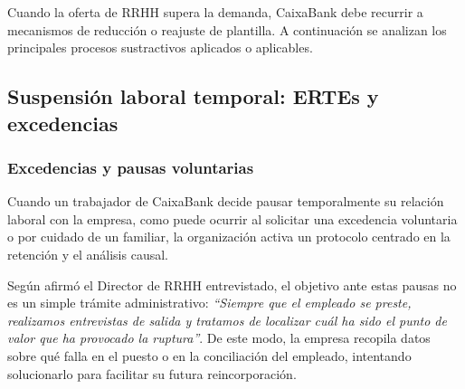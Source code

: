 %
%
%
%

Cuando la oferta de RRHH supera la demanda, CaixaBank debe recurrir a
mecanismos de reducción o reajuste de plantilla. A continuación se
analizan los principales procesos sustractivos aplicados o aplicables.
\subsection{Suspensión laboral temporal: ERTEs y excedencias}

\subsubsection{Excedencias y pausas voluntarias}

Cuando un trabajador de CaixaBank decide pausar temporalmente su relación laboral con la empresa, como puede ocurrir al solicitar una excedencia voluntaria o por cuidado de un familiar, la organización activa un protocolo centrado en la retención y el análisis causal. 

Según afirmó el Director de RRHH entrevistado, el objetivo ante estas pausas no es un simple trámite administrativo: \textit{``Siempre que el empleado se preste, realizamos entrevistas de salida y tratamos de localizar cuál ha sido el punto de valor que ha provocado la ruptura''}. De este modo, la empresa recopila datos sobre qué falla en el puesto o en la conciliación del empleado, intentando solucionarlo para facilitar su futura reincorporación.

